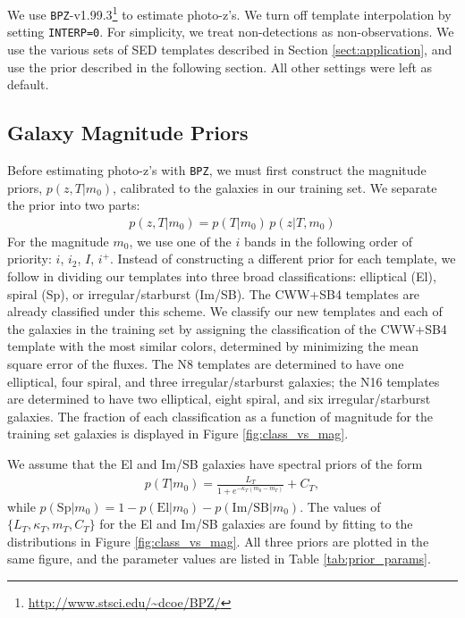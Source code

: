 \documentclass[twocolumn]{aastex63}
\newcommand{\pzcode}[1]{\texttt{#1}}
\newcommand{\bpz}{\pzcode{BPZ}}
\begin{document}
    We use \bpz-v1.99.3\footnote{\url{http://www.stsci.edu/~dcoe/BPZ/}} to estimate photo-z's.
    We turn off template interpolation by setting \texttt{INTERP=0}.
    For simplicity, we treat non-detections as non-observations.
    We use the various sets of SED templates described in Section \ref{sect:application}, and use the prior described in the following section.
    All other settings were left as default.

    \bigskip
    \subsection{Galaxy Magnitude Priors}

    Before estimating photo-z's with \bpz, we must first construct the magnitude priors, $p(z,T|m_0)$, calibrated to the galaxies in our training set.
    We separate the prior into two parts:
    \begin{align}
        p(z,T|m_0) = p(T|m_0) \, p(z|T,m_0)
    \end{align}
    For the magnitude $m_0$, we use one of the $i$ bands in the following order of priority: $i$, $i_2$, $I$, $i^+$.
    Instead of constructing a different prior for each template, we follow \citet{Benitez2000a} in dividing our templates into three broad classifications: elliptical (El), spiral (Sp), or irregular/starburst (Im/SB).
    The CWW+SB4 templates are already classified under this scheme.
    We classify our new templates and each of the galaxies in the training set by assigning the classification of the CWW+SB4 template with the most similar colors, determined by minimizing the mean square error of the fluxes.
    The N8 templates are determined to have one elliptical, four spiral, and three irregular/starburst galaxies; the N16 templates are determined to have two elliptical, eight spiral, and six irregular/starburst galaxies.
    The fraction of each classification as a function of magnitude for the training set galaxies is displayed in Figure \ref{fig:class_vs_mag}.

    We assume that the El and Im/SB galaxies have spectral priors of the form
    \begin{align}
        p(T|m_0) = \frac{L_T}{1+e^{-\kappa_T(m_0 - m_T)}} + C_T,
    \end{align}
    while $p(\text{Sp}|m_0) = 1 - p(\text{El}|m_0) - p(\text{Im/SB}|m_0)$.
    The values of $\{L_T,\kappa_T,m_T,C_T\}$ for the El and Im/SB galaxies are found by fitting to the distributions in Figure \ref{fig:class_vs_mag}.
    All three priors are plotted in the same figure, and the parameter values are listed in Table \ref{tab:prior_params}.
\end{document}
